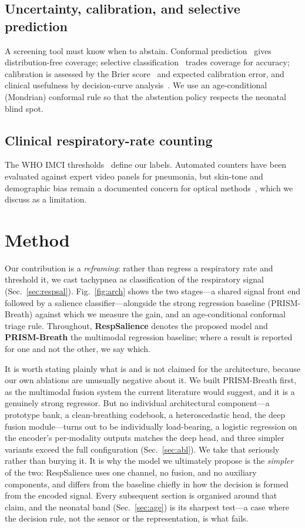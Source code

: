 \documentclass[journal]{IEEEtran}
\begin{document}
\subsection{Uncertainty, calibration, and selective prediction}
A screening tool must know when to abstain. Conformal prediction~\cite{vovk_alrw,angelopoulos_conformal}
gives distribution-free coverage; selective classification~\cite{geifman_selective} trades coverage for
accuracy; calibration is assessed by the Brier score~\cite{brier} and expected calibration error, and
clinical usefulness by decision-curve analysis~\cite{vickers_dca}. We use an age-conditional (Mondrian)
conformal rule so that the abstention policy respects the neonatal blind spot.

\subsection{Clinical respiratory-rate counting}
The WHO IMCI thresholds~\cite{who_imci} define our labels. Automated counters have been evaluated against
expert video panels for pneumonia, but skin-tone and demographic bias remain a documented concern for
optical methods~\cite{nowara_skintone}, which we discuss as a limitation.

\section{Method}
Our contribution is a \emph{reframing}: rather than regress a respiratory rate and threshold it, we cast
tachypnea as classification of the respiratory signal (Sec.~\ref{sec:respsal}). Fig.~\ref{fig:arch} shows
the two stages---a shared signal front end followed by a salience classifier---alongside the strong
regression baseline (PRISM-Breath) against which we measure the gain, and an age-conditional conformal
triage rule. Throughout, \textbf{RespSalience} denotes the proposed model and \textbf{PRISM-Breath} the
multimodal regression baseline; where a result is reported for one and not the other, we say which.

It is worth stating plainly what is and is not claimed for the architecture, because our own ablations
are unusually negative about it. We built PRISM-Breath first, as the multimodal fusion system the
current literature would suggest, and it is a genuinely strong regressor. But no individual
architectural component---a prototype bank, a clean-breathing codebook, a heteroscedastic head, the deep
fusion module---turns out to be individually load-bearing, a logistic regression on the encoder's
per-modality outputs matches the deep head, and three simpler variants exceed the full configuration
(Sec.~\ref{sec:abl}). We take that seriously rather than burying it. It is why the model we ultimately
propose is the \emph{simpler} of the two: RespSalience uses one channel, no fusion, and no auxiliary
components, and differs from the baseline chiefly in how the decision is formed from the encoded signal.
Every subsequent section is organised around that claim, and the neonatal band (Sec.~\ref{sec:age}) is
its sharpest test---a case where the decision rule, not the sensor or the representation, is what
fails.
\end{document}
